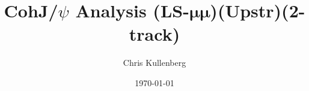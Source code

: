 \title{CohJ/$\psi$ Analysis (\textbf{LS}-$\boldsymbol{\mu\mu}$)(\textbf{Upstr})(\textbf{2-track})}
\author{Chris Kullenberg}
\date{\today}
